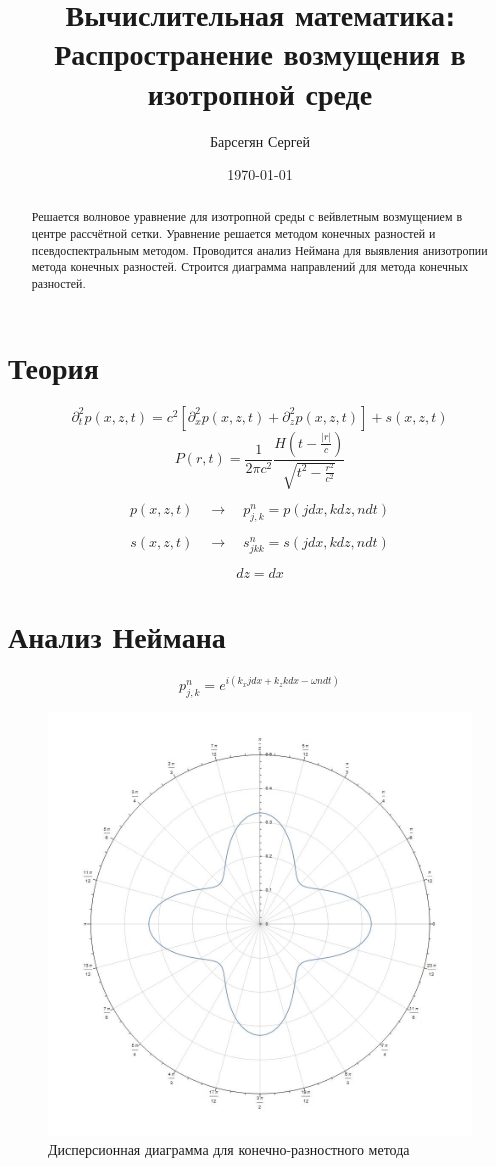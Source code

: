 \documentclass[a4paper,12pt]{article}
\author{Барсегян Сергей}
\title{Вычислительная математика։ Распространение возмущения в изотропной среде}
\date{\today}
\theoremstyle{plain} %
\theoremstyle{remark} %
\begin{document}
\maketitle

\begin{abstract}
	Решается волновое уравнение для изотропной среды с вейвлетным возмущением в центре рассчётной сетки. Уравнение решается методом конечных разностей и псевдоспектральным методом. Проводится анализ Неймана для выявления анизотропии метода конечных разностей. Строится диаграмма направлений для метода конечных разностей. 
\end{abstract}

\section{Теория}

$$
\partial_{t}^{2} p(x, z, t)=c^{2}\left[\partial_{x}^{2} p(x, z, t)+\partial_{z}^{2}p(x, z, t)\right]+s(x, z, t)
$$
$$
P(r, t)=\frac{1}{2 \pi c^{2}} \frac{H\left(t-\frac{|r|}{c}\right)}{\sqrt{t^{2}-\frac{r^{2}}{c^{2}}}}
$$

$$
p(x, z, t) \quad \rightarrow \quad p_{j, k}^{n}=p(j d x, k d z, n d t)
$$

$$
s ( x , z , t ) \quad \rightarrow \quad s _ { j k k } ^ { n } = s ( j d x , k d z , n d t )
$$

$$d z = d x
$$



\section{Анализ Неймана}

$$
p_{j,k}^{n} = e^{i\left(k_{x}j d x + k_{z}kdx - \omega ndt \right)}$$
	


\begin{figure}
	\centering
	\includegraphics[width=0.7\linewidth]{screenshot003}
	\caption{Дисперсионная диаграмма для конечно-разностного метода}
	\label{fig:screenshot003}
\end{figure}
\end{document}
